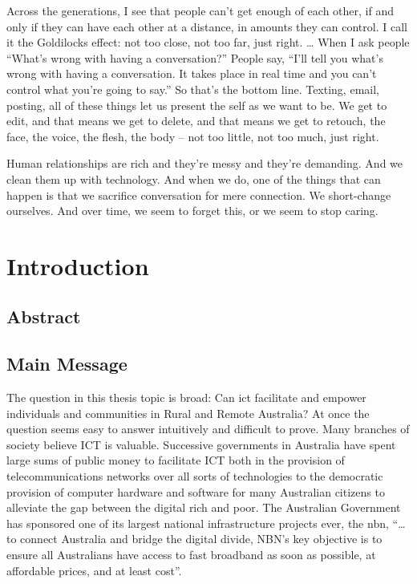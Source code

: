 \begin{savequote}[10cm] %
\sffamily
Across the generations, I see that people can't get enough of each other, if and only if they can have each other at a distance, in amounts they can control. I call it the Goldilocks effect: not too close, not too far, just right.
\ldots
When I ask people ``What's wrong with having a conversation?'' People say, ``I'll tell you what's wrong with having a conversation. It takes place in real time and you can't control what you're going to say.'' So that's the bottom line. Texting, email, posting, all of these things let us present the self as we want to be. We get to edit, and that means we get to delete, and that means we get to retouch, the face, the voice, the flesh, the body -- not too little, not too much, just right.

Human relationships are rich and they're messy and they're demanding. And we clean them up with technology. And when we do, one of the things that can happen is that we sacrifice conversation for mere connection. We short-change ourselves. And over time, we seem to forget this, or we seem to stop caring.\cite{Turkle}

\end{savequote}

\chapter{Introduction}

\section{Abstract}
\section{Main Message}
The question in this thesis topic is broad: Can \acrfull{ict} facilitate and empower individuals and communities in Rural and Remote Australia? At once the question seems easy to answer intuitively and difficult to prove. Many branches of society believe ICT is  valuable. Successive governments in Australia have spent large sums of public money to facilitate ICT both in the provision of telecommunications networks over all sorts of technologies to the democratic provision of computer hardware and software for many Australian citizens to alleviate the gap between the digital rich and poor. The Australian Government has sponsored one of its largest national infrastructure projects ever, the \acrfull{nbn}, ``\ldots to connect Australia and bridge the digital divide, NBN’s key objective is to ensure all Australians have access to fast broadband as soon as possible, at affordable prices, and at least cost''\cite{RefWorks:459}.

